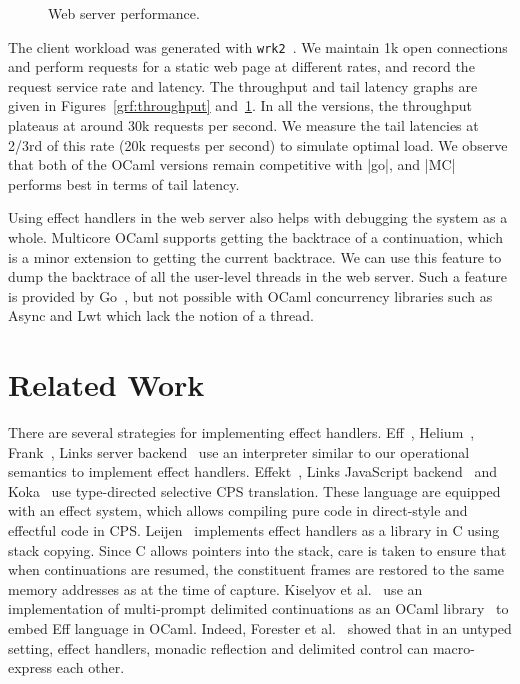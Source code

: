 \documentclass[sigplan,10pt,review,anonymous]{acmart}\settopmatter{printfolios=true,printccs=false,printacmref=false}
\begin{document}
\begin{figure}
\begin{minipage}{0.49\linewidth}
		\label{grf:latency}
	\end{minipage}
	\vspace{-3mm}
	\caption{Web server performance.}
	\vspace{-4mm}
\end{figure}

The client workload was generated with \texttt{wrk2}~\cite{wrk2}. We maintain
1k open connections and perform requests for a static web page at different
rates, and record the request service rate and latency. The throughput and tail
latency graphs are given in Figures~\ref{grf:throughput} and~\ref{grf:latency}.
In all the versions, the throughput plateaus at around 30k requests per second.
We measure the tail latencies at 2/3rd of this rate (20k requests per second)
to simulate optimal load. We observe that both of the OCaml versions remain
competitive with |go|, and |MC| performs best in terms of tail latency.

Using effect handlers in the web server also helps with debugging the system as
a whole. Multicore OCaml supports getting the backtrace of a continuation,
which is a minor extension to getting the current backtrace. We can use this
feature to dump the backtrace of all the user-level threads in the web server.
Such a feature is provided by Go~\cite{gopprof}, but not possible with OCaml
concurrency libraries such as Async and Lwt which lack the notion of a thread.

\vspace{-3mm}
\section{Related Work}
\label{sec:related}

There are several strategies for implementing effect handlers. Eff~\cite{Eff},
Helium~\cite{Biernacki20}, Frank~\cite{Frank}, Links server
backend~\cite{Hillerstrom20} use an interpreter similar to our operational
semantics to implement effect handlers. Effekt~\cite{Effekt}, Links JavaScript
backend~\cite{Hillerstrom20} and Koka~\cite{Leijen17} use type-directed
selective CPS translation. These language are equipped with an effect system,
which allows compiling pure code in direct-style and effectful code in CPS.
Leijen~\cite{Leijen14} implements effect handlers as a library in C using stack
copying. Since C allows pointers into the stack, care is taken to ensure that
when continuations are resumed, the constituent frames are restored to the same
memory addresses as at the time of capture. Kiselyov et al.~\cite{Kiselyov18}
use an implementation of multi-prompt delimited continuations as an OCaml
library~\cite{Kiselyov12} to embed Eff language in OCaml. Indeed, Forester et
al.~\cite{Forster19} showed that in an untyped setting, effect handlers,
monadic reflection and delimited control can macro-express each other.
\end{document}
